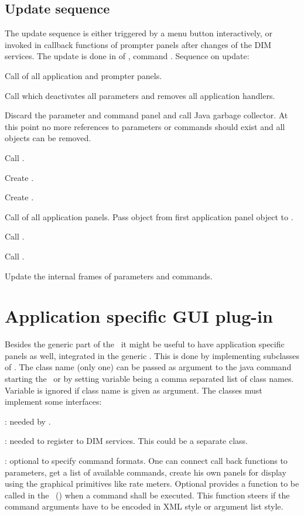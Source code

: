 \subsection{Update sequence}
The update sequence is either triggered by a menu button interactively, or invoked
in callback functions of prompter panels
after changes of the DIM services.
The update is done in  of , command .
Sequence on update:
\bnum
\item Call  of all application and prompter panels.
\item Call  which deactivates all parameters and removes all
application handlers.
\item Discard the parameter and command panel and call Java garbage collector.
At this point no more references to parameters or commands should exist and
all objects can be removed.
\item Call .
\item Create .
\item Create .
\item Call  of all application panels. Pass
 object from first application panel object to .
\item Call . 
\item Call .
\item Update the internal frames of parameters and commands.
\enum 

\section{Application specific GUI plug-in}
Besides the generic part of the \gui\ it might be useful to have application specific panels as well, integrated in the generic \gui. This is done by implementing subclasses of  . The class name (only one) can be passed as argument to the java command starting the \gui\ or by setting variable  being a comma separated list of class names.
Variable is ignored if class name is given as argument.
The classes must implement some interfaces:
\bdes
\item [\class{xiUserPanel}]: needed by \gui.
\item [\class{xiUserInfoHandler}]: needed to register to DIM services. This could be a separate
class.
\item [\class{xiUserCommand}]: optional to specify command formats.
\edes
One can connect call back functions to parameters, 
get a list of available commands,
create his own panels for display using the graphical primitives like rate meters.
Optional  provides a function to be called in the \gui\ 
() when a command shall be executed. This function steers if the command arguments have to be
encoded in XML style or argument list style.

